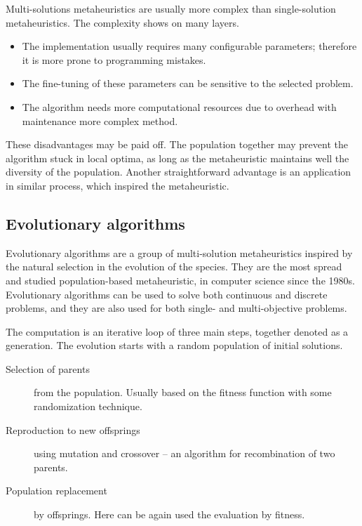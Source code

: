 \documentclass[
  print, %
  Table,   %
  nolof,     %
  nolot,     %
  11pt, %
  oneside  %
]{fithesis3}
\begin{document}
Multi-solutions metaheuristics are usually more complex than single-solution metaheuristics. The complexity shows on many layers.

\begin{itemize}
    \item The implementation usually requires many configurable parameters; therefore it is more prone to programming mistakes.
    \item The fine-tuning of these parameters can be sensitive to the selected problem.
    \item The algorithm needs more computational resources due to overhead with maintenance more complex method.
\end{itemize}

These disadvantages may be paid off. The population together may prevent the algorithm stuck in local optima, as long as the metaheuristic maintains well the diversity of the population. Another straightforward advantage is an application in similar process, which inspired the metaheuristic.

\subsection{Evolutionary algorithms}
\label{subsec:opt-multi-sol-ea}

Evolutionary algorithms are a group of multi-solution metaheuristics inspired by the natural selection in the evolution of the species. They are the most spread and studied population-based metaheuristic, in computer science since the 1980s. Evolutionary algorithms can be used to solve both continuous and discrete problems, and they are also used for both single- and multi-objective problems.

The computation is an iterative loop of three main steps, together denoted as a generation. The evolution starts with a random population of initial solutions.

\begin{description}
    \item[Selection of parents] from the population. Usually based on the fitness function with some randomization technique.
    \item[Reproduction to new offsprings] using mutation and crossover -- an algorithm for recombination of two parents. 
    \item[Population replacement] by offsprings. Here can be again used the evaluation by fitness. 
\end{description}
\end{document}
